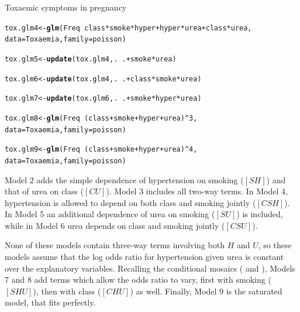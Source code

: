 \documentclass[11pt]{book}\usepackage[]{graphicx}\usepackage[]{color}
\makeatletter
\newcommand{\hlnum}[1]{\textcolor[rgb]{0.686,0.059,0.569}{#1}}%
\newcommand{\hlopt}[1]{\textcolor[rgb]{0,0,0}{#1}}%
\newcommand{\hlstd}[1]{\textcolor[rgb]{0.345,0.345,0.345}{#1}}%
\newcommand{\hlkwb}[1]{\textcolor[rgb]{0.69,0.353,0.396}{#1}}%
\newcommand{\hlkwc}[1]{\textcolor[rgb]{0.333,0.667,0.333}{#1}}%
\newcommand{\hlkwd}[1]{\textcolor[rgb]{0.737,0.353,0.396}{\textbf{#1}}}%
\newenvironment{kframe}{%
 \def\at@end@of@kframe{}%
 \ifinner\ifhmode%
  \def\at@end@of@kframe{\end{minipage}}%
  \begin{minipage}{\columnwidth}%
 \fi\fi%
 \def\FrameCommand##1{\hskip\@totalleftmargin \hskip-\fboxsep
 \colorbox{shadecolor}{##1}\hskip-\fboxsep
     \hskip-\linewidth \hskip-\@totalleftmargin \hskip\columnwidth}%
 \MakeFramed {\advance\hsize-\width
   \@totalleftmargin\z@ \linewidth\hsize
   \@setminipage}}%
 {\par\unskip\endMakeFramed%
 \at@end@of@kframe}
\newenvironment{knitrout}{}{} %
\renewenvironment{knitrout}{\small\renewcommand{\baselinestretch}{.85}}{} %
\makeatother
\begin{document}
\begin{Example}[toxaemia]{Toxaemic symptoms in pregnancy}
\begin{knitrout}
\begin{kframe}
\begin{alltt}
\hlstd{tox.glm4} \hlkwb{<-} \hlkwd{glm}\hlstd{(Freq} \hlopt{~} \hlstd{class}\hlopt{*}\hlstd{smoke}\hlopt{*}\hlstd{hyper} \hlopt{+} \hlstd{hyper}\hlopt{*}\hlstd{urea} \hlopt{+} \hlstd{class}\hlopt{*}\hlstd{urea,}
                \hlkwc{data}\hlstd{=Toxaemia,} \hlkwc{family}\hlstd{=poisson)}

\hlstd{tox.glm5} \hlkwb{<-} \hlkwd{update}\hlstd{(tox.glm4, .} \hlopt{~} \hlstd{.} \hlopt{+} \hlstd{smoke}\hlopt{*}\hlstd{urea)}

\hlstd{tox.glm6} \hlkwb{<-} \hlkwd{update}\hlstd{(tox.glm4, .} \hlopt{~} \hlstd{.} \hlopt{+} \hlstd{class}\hlopt{*}\hlstd{smoke}\hlopt{*}\hlstd{urea)}

\hlstd{tox.glm7} \hlkwb{<-} \hlkwd{update}\hlstd{(tox.glm6, .} \hlopt{~} \hlstd{.} \hlopt{+} \hlstd{smoke}\hlopt{*}\hlstd{hyper}\hlopt{*}\hlstd{urea)}

\hlstd{tox.glm8} \hlkwb{<-} \hlkwd{glm}\hlstd{(Freq} \hlopt{~} \hlstd{(class} \hlopt{+} \hlstd{smoke} \hlopt{+} \hlstd{hyper} \hlopt{+} \hlstd{urea)}\hlopt{^}\hlnum{3}\hlstd{,}
                \hlkwc{data}\hlstd{=Toxaemia,} \hlkwc{family}\hlstd{=poisson)}

\hlstd{tox.glm9} \hlkwb{<-} \hlkwd{glm}\hlstd{(Freq} \hlopt{~} \hlstd{(class} \hlopt{+} \hlstd{smoke} \hlopt{+} \hlstd{hyper} \hlopt{+} \hlstd{urea)}\hlopt{^}\hlnum{4}\hlstd{,}
                \hlkwc{data}\hlstd{=Toxaemia,} \hlkwc{family}\hlstd{=poisson)}
\end{alltt}
\end{kframe}
\end{knitrout}

Model 2 adds the simple dependence of hypertension on smoking ($[SH]$)
and that of urea on class ($[CU]$).
Model 3 includes all two-way terms.
In Model 4, hypertension is allowed to depend on both class and smoking
jointly ($[CSH]$). In Model 5 an additional dependence of
urea on smoking ($[SU]$) is included, while in Model 6 urea depends on
class and smoking jointly ($[CSU]$).

None of these models contain three-way terms involving both $H$ and $U$,
so these models assume that the log odds ratio for hypertension given urea
is constant over the explanatory variables.
Recalling the conditional mosaics ( and ),
Models 7 and 8 add terms
which allow the odds ratio to vary, first with smoking ($[SHU]$), then
with class ($[CHU]$) as well.
Finally, Model 9 is the saturated model, that fits perfectly.


\end{Example}
\end{document}
